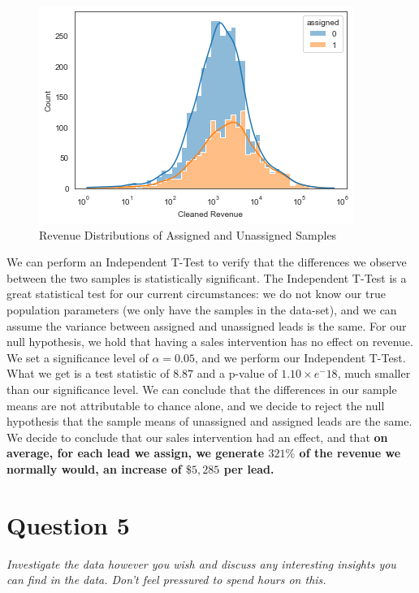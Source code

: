 \documentclass[11pt]{article}
\begin{document}
\begin{figure}[b!]
    \centering
    \includegraphics[scale=.5]{Images/joint_histogram.png}
    \caption{Revenue Distributions of Assigned and Unassigned Samples}
    \label{fig:my_label}
\end{figure}
We can perform an Independent T-Test to verify that the differences we observe between the two samples is statistically significant. The Independent T-Test is a great statistical test for our current circumstances: we do not know our true population parameters (we only have the samples in the data-set), and we can assume the variance between assigned and unassigned leads is the same. For our null hypothesis, we hold that having a sales intervention has no effect on revenue. We set a significance level of $\alpha=0.05$, and we perform our Independent T-Test. What we get is a test statistic of $8.87$ and a p-value of $1.10 \times e^-18$, much smaller than our significance level. We can conclude that the differences in our sample means are not attributable to chance alone, and we decide to reject the null hypothesis that the sample means of unassigned and assigned leads are the same. We decide to conclude that our sales intervention had an effect, and that \textbf{on average, for each lead we assign, we generate $321\%$ of the revenue we normally would, an increase of $\$5,285$ per lead.}  


\newpage


\section{Question 5}
\textit{Investigate the data however you wish and discuss any interesting insights you
can find in the data. Don't feel pressured to spend hours on this.}\\
\end{document}
